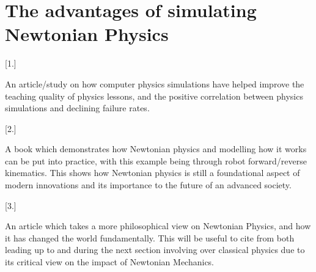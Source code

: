 \documentclass[11pt]{article}
\begin{document}
\section{The advantages of simulating Newtonian Physics}

[1.] \parencite{physics_learning} \par An article/study on how computer physics simulations have helped
improve the teaching quality of physics lessons, and the positive correlation between physics simulations and declining failure rates.

[2.] \parencite{robot_kinematics} \par A book which demonstrates how Newtonian physics and modelling how it works can be put into practice,
with this example being through robot forward/reverse kinematics. This shows how Newtonian physics is still a foundational aspect of modern innovations 
and its importance to the future of an advanced society.

[3.] \parencite{newtonian_synthesis} \par An article which takes a more philosophical view on Newtonian Physics, and how it has changed the world fundamentally.
This will be useful to cite from both leading up to and during the next section involving  over classical physics due to its critical view on the impact
of Newtonian Mechanics.

\newpage



\printbibliography
\end{document}
